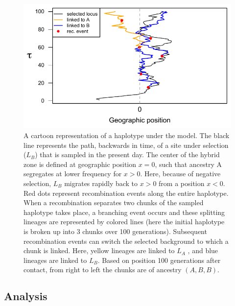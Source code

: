 \documentclass[11pt,letterpaper]{article}
\begin{document}
\begin{figure}
\includegraphics{figs/BM_schematic}
\caption{A cartoon representation of a haplotype under the model. The black line represents the path, backwards in time, of a site under selection ($L_B$) that is sampled in the present day. The center of the hybrid zone is defined at geographic position $x=0$, such that ancestry A segregates at lower frequency for $x>0$. Here, because of negative selection, $L_B$ migrates rapidly back to $x>0$ from a position $x<0$. Red dots represent recombination events along the entire haplotype. When a recombination separates two chunks of the sampled haplotype takes place, a branching event occurs and these splitting lineages are represented by colored lines (here the initial haplotype is broken up into 3 chunks over 100 generations). Subsequent recombination events can switch the selected background to which a chunk is linked.  Here, yellow lineages are linked to $L_A$ , and blue lineages are linked to $L_B$. Based on position 100 generations after contact, from right to left the chunks are of ancestry $(A,B,B)$.}\label{Fig:schematic}
\end{figure}



\subsection*{Analysis}
\end{document}
